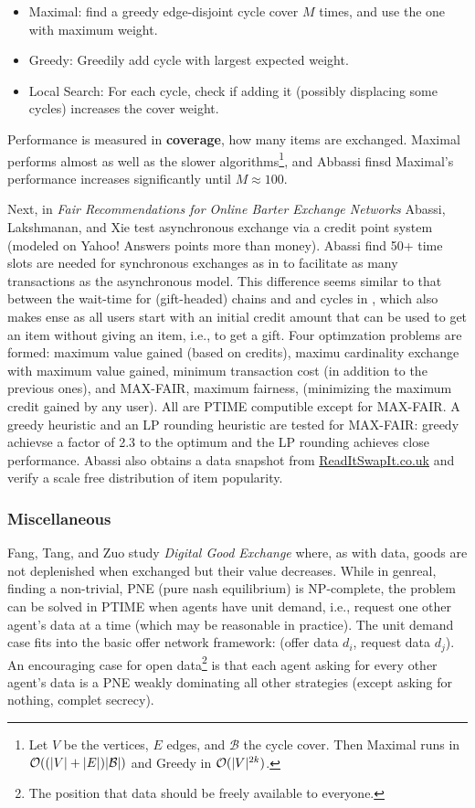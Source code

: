 \documentclass[main.tex]{subfiles}
\begin{document}
\begin{itemize}
  \item Maximal: find a greedy edge-disjoint cycle cover $M$ times, and use the one with maximum weight.
  \item Greedy: Greedily add cycle with largest expected weight.
  \item Local Search: For each cycle, check if adding it (possibly displacing some cycles) increases the cover weight.
\end{itemize}

Performance is measured in \textbf{coverage}, how many items are exchanged. Maximal performs almost as well as the slower algorithms\footnote{Let $V$ be the vertices, $E$ edges, and $\mathcal{B}$ the cycle cover. Then Maximal runs in $\mathcal{O}((|V| + |E|)|\mathcal{B}|)$ and Greedy  in $\mathcal{O}(|V|^{2k})$.}, and Abbassi finsd Maximal's performance increases significantly until $M \approx 100$.

Next, in \textit{Fair Recommendations for Online Barter Exchange Networks} Abassi, Lakshmanan, and Xie \cite{Abb2} test asynchronous exchange via a credit point system (modeled on Yahoo! Answers points more than money). Abassi find 50+ time slots are needed for synchronous exchanges as in \cite{Abb1} to facilitate as many transactions as the asynchronous model. This difference seems similar to that between the wait-time for (gift-headed) chains and and cycles in \cite{And1}, which also makes ense as all users start with an initial credit amount that can be used to get an item without giving an item, i.e., to get a gift. Four optimzation problems are formed: maximum value gained (based on credits), maximu cardinality exchange with maximum value gained, minimum transaction cost (in addition to the previous ones), and MAX-FAIR, maximum fairness, (minimizing the maximum credit gained by any user). All are PTIME computible except for MAX-FAIR. A greedy heuristic and an LP rounding heuristic are tested for MAX-FAIR: greedy achievse a factor of 2.3 to the optimum and the LP rounding achieves close performance. Abassi also obtains a data snapshot from \url{ReadItSwapIt.co.uk} and verify a scale free distribution of item popularity.

\subsubsection{Miscellaneous}

Fang, Tang, and Zuo study \textit{Digital Good Exchange} \cite{Fang} where, as with data, goods are not deplenished when exchanged but their value decreases. While in genreal, finding a non-trivial, PNE (pure nash equilibrium) is NP-complete, the problem can be solved in PTIME when agents have unit demand, i.e., request one other agent's data at a time (which may be reasonable in practice). The unit demand case fits into the basic offer network framework: (offer data $d_i$, request data $d_j$). An encouraging case for open data\footnote{The position that data should be freely available to everyone.} is that each agent asking for every other agent's data is a PNE weakly dominating all other strategies (except asking for nothing, complet secrecy).
\end{document}
